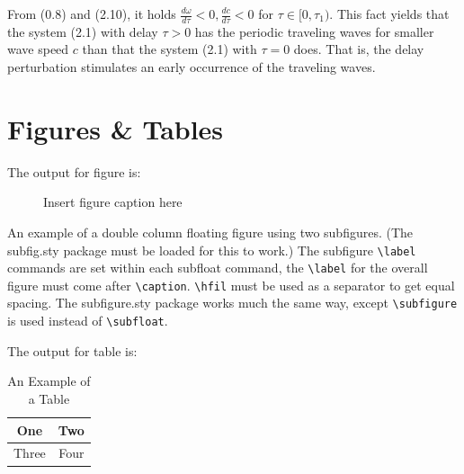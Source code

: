 \documentclass{comnet}%
\begin{document}
\begin{condition}\label{C2.2}
From (0.8) and (2.10), it holds
$\frac{d\omega}{d\tau}<0,\frac{dc}{d\tau}<0$ for $\tau\in
[0,\tau_1)$. This fact yields that the system (2.1) with delay
$\tau>0$ has the periodic traveling waves for smaller wave speed $c$
than that the system (2.1) with $\tau=0$ does. That is, the
delay perturbation stimulates an early occurrence of the traveling waves.
\end{condition}


\section{Figures \& Tables}

The output for figure is:

\begin{figure}[!h]
\caption{Insert figure caption here}
\label{fig_sim}
\end{figure}

 An example of a double column floating figure using two subfigures.
 (The subfig.sty package must be loaded for this to work.)
 The subfigure \verb+\label+ commands are set within each subfloat command, the
 \verb+\label+ for the overall figure must come after \verb+\caption+.
 \verb+\hfil+ must be used as a separator to get equal spacing.
 The subfigure.sty package works much the same way, except \verb+\subfigure+ is
 used instead of \verb+\subfloat+.


\vskip2pc

\noindent The output for table is:

\begin{table}[!h]
\caption{An Example of a Table}%
\label{table_example}
\centering
\begin{tabular}{|c||c|}%
\hline
One & Two\\ %
\hline
Three & Four\\%
\hline
\end{tabular}
\end{table}%
\end{document}
